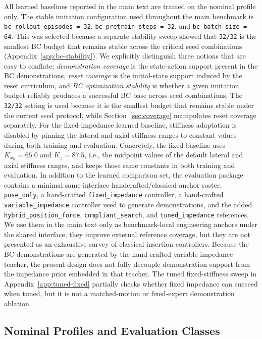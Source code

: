 ﻿\documentclass[11pt]{article}
\newcommand{\code}[1]{\nolinkurl{#1}}
\begin{document}
All learned baselines reported in the main text are trained on the nominal profile only. The stable imitation
configuration used throughout the main benchmark is
\code{bc\_rollout\_episodes = 32}, \code{bc\_pretrain\_steps = 32}, and
\code{bc\_batch\_size = 64}. This was selected because a separate stability sweep showed that
\code{32/32} is the smallest BC budget that remains stable across the critical seed combinations
(Appendix~\ref{app:bc-stability}).
We explicitly distinguish three notions that are easy to conflate: \emph{demonstration coverage}
is the state-action support present in the BC demonstrations, \emph{reset coverage} is the
initial-state support induced by the reset curriculum, and \emph{BC optimization stability} is
whether a given imitation budget reliably produces a successful BC base across seed combinations.
The \code{32/32} setting is used because it is the smallest budget that remains stable under the
current seed protocol, while Section~\ref{sec:coverage} manipulates reset coverage separately.
For the fixed-impedance learned baseline, stiffness adaptation is disabled by pinning the lateral
and axial stiffness ranges to constant values during both training and evaluation. Concretely, the
fixed baseline uses \mbox{$K_{xy}=65.0$} and \mbox{$K_z=87.5$}, i.e., the midpoint values of the
default lateral and axial stiffness ranges, and keeps those same constants in both training and
evaluation.
In addition to the learned comparison set, the evaluation package contains a minimal
same-interface handcrafted/classical anchor roster: \code{pose\_only}, a hand-crafted
\code{fixed\_impedance} controller, a hand-crafted \code{variable\_impedance} controller used to
generate demonstrations, and the added \code{hybrid\_position\_force},
\code{compliant\_search}, and \code{tuned\_impedance} references. We use them in the main text
only as benchmark-local engineering anchors under the shared interface; they improve external
reference coverage, but they are not presented as an exhaustive survey of classical insertion
controllers. Because the BC demonstrations are generated by the hand-crafted variable-impedance
teacher, the present design does not fully decouple demonstration support from the impedance prior
embedded in that teacher. The tuned fixed-stiffness sweep in Appendix~\ref{app:tuned-fixed}
partially checks whether fixed impedance can succeed when tuned, but it is not a matched-motion
or fixed-expert demonstration ablation.

\subsection{Nominal Profiles and Evaluation Classes}
\end{document}
